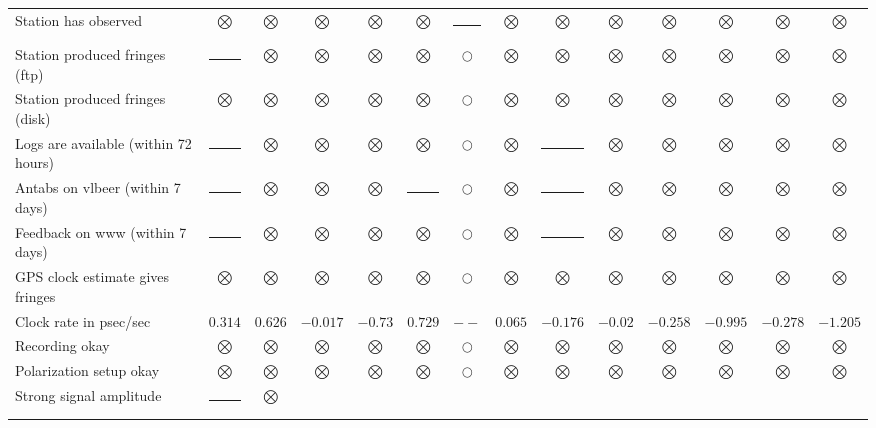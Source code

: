 \documentclass{report}
\newcommand{\ntry}{$\bigcirc$}
\newcommand{\okay}{$\bigotimes$} %
\newcommand{\err}{\rule[-0.065cm]{0.3cm}{0.3cm}} %
\begin{document}
\begin{landscape}
\begin{table}
\begin{flushleft}
\begin{tabular}{l|ccccccccccccc}
Station has observed
&\okay %
&\okay %
&\okay %
&\okay %
&\okay %
&\err %
&\okay %
&\okay %
&\okay %
&\okay %
&\okay %
&\okay %
&\okay %
\\
Station produced fringes (ftp)
&\err %
&\okay %
&\okay %
&\okay %
&\okay %
&\ntry %
&\okay %
&\okay %
&\okay %
&\okay %
&\okay %
&\okay %
&\okay %
\\
Station produced fringes (disk)
&\okay %
&\okay %
&\okay %
&\okay %
&\okay %
&\ntry %
&\okay %
&\okay %
&\okay %
&\okay %
&\okay %
&\okay %
&\okay %
\\
\noalign{\smallskip}
\cline{2-14}
\noalign{\smallskip}
\cline{2-14}
\noalign{\smallskip}
Logs are available (within 72 hours)
&\err  %
&\okay %
&\okay %
&\okay %
&\okay %
&\ntry %
&\okay %
&\err  %
&\okay %
&\okay %
&\okay %
&\okay %
&\okay %
\\
Antabs on vlbeer (within 7 days)
&\err  %
&\okay %
&\okay %
&\okay %
&\err  %
&\ntry %
&\okay %
&\err  %
&\okay %
&\okay %
&\okay %
&\okay %
&\okay %
\\
Feedback on www (within 7 days)
&\err  %
&\okay %
&\okay %
&\okay %
&\okay %
&\ntry %
&\okay %
&\err  %
&\okay %
&\okay %
&\okay %
&\okay %
&\okay %
\\
\noalign{\smallskip}
GPS clock estimate gives fringes
&\okay %
&\okay %
&\okay %
&\okay %
&\okay %
&\ntry %
&\okay %
&\okay %
&\okay %
&\okay %
&\okay %
&\okay %
&\okay %
\\
\cline{2-14}
Clock rate in psec/sec
&$0.314$ %
&$0.626$ %
&$-0.017$ %
&$-0.73$ %
&$0.729$ %
&$--$ %
&$0.065$ %
&$-0.176$ %
&$-0.02$ %
&$-0.258$ %
&$-0.995$ %
&$-0.278$ %
&$-1.205$ %
\\
\cline{2-14}
\noalign{\smallskip}
Recording okay
&\okay %
&\okay %
&\okay %
&\okay %
&\okay %
&\ntry %
&\okay %
&\okay %
&\okay %
&\okay %
&\okay %
&\okay %
&\okay %
\\
\noalign{\smallskip}
Polarization setup okay
&\okay %
&\okay %
&\okay %
&\okay %
&\okay %
&\ntry %
&\okay %
&\okay %
&\okay %
&\okay %
&\okay %
&\okay %
&\okay %
\\
Strong signal amplitude
&\err  %
&\okay %

\end{tabular}
\end{flushleft}
\end{table}
\end{landscape}
\end{document}
